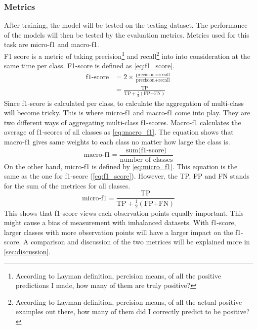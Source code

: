 \documentclass[10pt, a4paper, twocolumn]{article} %
\begin{document}
\subsubsection{Metrics}
After training, the model will be tested on the testing dataset. The performance of the models will then be tested by 
the evaluation metrics. Metrics used for this task are micro-f1 and macro-f1.\\[10pt]
F1 score is a metric of taking precision\footnote{According to Layman definition, percision means, 
of all the positive predictions I made, how many of them are truly positive?} and 
recall\footnote{According to Layman definition, percision means, of all the actual positive examples 
out there, how many of them did I correctly predict to be positive?} into into consideration at the 
same time per class. F1-score is defined as \autoref{eq:f1_score}.\\[10pt]
\begin{equation}\label{eq:f1_score}
	\begin{split}
		\text{f1-score} &= 2\times \frac{\text{precision} \times \text{recall}}{\text{precision} + \text{recall}}\\
		&= \frac{\text{TP}}{\text{TP}+\frac{1}{2}(\text{FP+FN})}
	\end{split}
\end{equation}
Since f1-score is calculated per class, to calculate the aggregation of multi-class will become tricky. 
This is where micro-f1 and macro-f1 come into play. They are two different ways of aggregating multi-class 
f1-scores. Macro-f1 calculates the average of f1-scores of all classes as \autoref{eq:macro_f1}. The equation 
shows that macro-f1 gives same weights to each class no matter how large the class is. 
\begin{equation}\label{eq:macro_f1}
	\text{macro-f1} = \frac{\text{sum(f1-score)}}{\text{number of classes}}
\end{equation}
On the other hand, micro-f1 is defined by \autoref{eq:micro_f1}. This equation is the same as the one for 
f1-score (\autoref{eq:f1_score}). However, the TP, FP and FN stands for the sum of the metrices for all classes.  
\begin{equation}\label{eq:micro_f1}
	\text{micro-f1} = \frac{\text{TP}}{\text{TP}+\frac{1}{2}(\text{FP+FN})}
\end{equation}
This shows that f1-score views each observation points equally important. This might cause a bias of measurement 
with imbalanced datasets. With f1-score, larger classes with more observation points will have a larger impact on 
the f1-score. A comparison and discussion of the two metrices will be explained more in \autoref{sec:discussion}.
\end{document}
